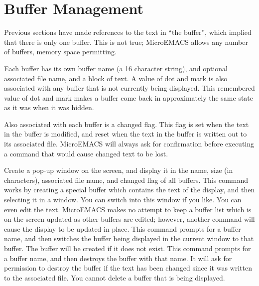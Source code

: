 \section{Buffer Management}
Previous sections have made references to the text in ``the buffer'',
which implied that there is only one buffer. This is not true; MicroEMACS
allows any number of buffers, memory space permitting.

Each buffer has its own buffer name (a 16 character string),
and optional associated file name,
and a block of text. A value of dot and mark is also associated with
any buffer that is not currently being displayed. This remembered value
of dot and mark makes a buffer come back in approximately the same state
as it was when it was hidden.

Also associated with each buffer is a changed flag. This flag is set
when the text in the buffer is modified, and reset when the text in the
buffer is written out to its associated file. MicroEMACS will always ask
for confirmation before executing a command that would cause changed
text to be lost.
\begin{cmdlist}
Create a pop-up window on the screen, and display it in
the name, size (in characters), associated file name, and changed flag
of all buffers. This command works by creating a special buffer which
contains the text of the display, and then selecting it in a window. You
can switch into this window if you like. You can even edit the text.
MicroEMACS makes no attempt to keep a buffer list which is on the screen
updated as other buffers are edited; however, another  command
will cause the display to be updated in place.
This command prompts for a buffer name, and then switches
the buffer being displayed in the current window to that buffer. The
buffer will be created if it does not exist.
This command prompts for a buffer name, and then destroys
the buffer with that name. It will ask for permission to destroy the
buffer if the text has been changed since it was written to the associated
file. You cannot delete a buffer that is being displayed.
\end{cmdlist}
